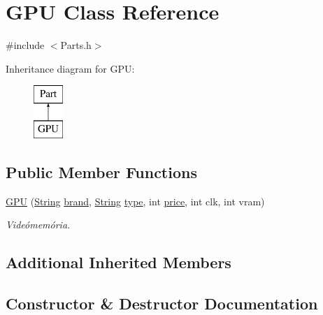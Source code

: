 \hypertarget{class_g_p_u}{}\section{G\+PU Class Reference}
\label{class_g_p_u}


{\ttfamily \#include $<$Parts.\+h$>$}

Inheritance diagram for G\+PU\+:\begin{figure}[H]
\begin{center}
\leavevmode
\includegraphics[height=2.000000cm]{class_g_p_u}
\end{center}
\end{figure}
\subsection*{Public Member Functions}
\begin{DoxyCompactItemize}
\item 
\mbox{\hyperlink{class_g_p_u_a358f512b1583399e68f76248bb305e61}{G\+PU}} (\mbox{\hyperlink{class_string}{String}} \mbox{\hyperlink{class_part_ae06f2fdeb7fbbdb229a7aca151f3e341}{brand}}, \mbox{\hyperlink{class_string}{String}} \mbox{\hyperlink{class_part_a101dbcc5c4b21564df7414c7eb0eae88}{type}}, int \mbox{\hyperlink{class_part_a8e71223aed1da95a974f33d8d6c91bb1}{price}}, int clk, int vram)
\begin{DoxyCompactList}\small\item\em Videómemória. \end{DoxyCompactList}\end{DoxyCompactItemize}
\subsection*{Additional Inherited Members}


\subsection{Constructor \& Destructor Documentation}
\mbox{\label{class_g_p_u_a358f512b1583399e68f76248bb305e61}} 
